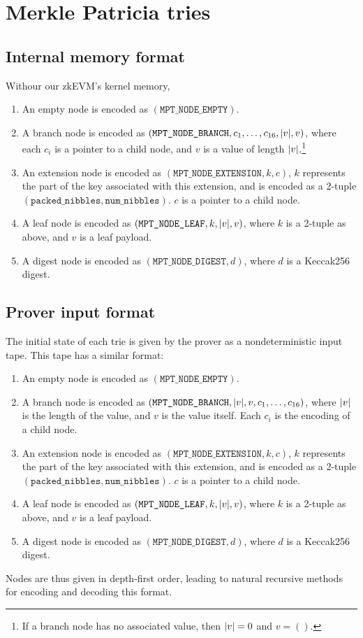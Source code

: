 \section{Merkle Patricia tries}
\label{tries}

\subsection{Internal memory format}

Withour our zkEVM's kernel memory,
\begin{enumerate}
  \item An empty node is encoded as $(\texttt{MPT\_NODE\_EMPTY})$.
  \item A branch node is encoded as $(\texttt{MPT\_NODE\_BRANCH}, c_1, \dots, c_{16}, \lvert v\rvert, v)$, where each $c_i$ is a pointer to a child node, and $v$ is a value of length $\lvert v\rvert$.\footnote{If a branch node has no associated value, then $\lvert v\rvert = 0$ and $v = ()$.}
  \item An extension node is encoded as $(\texttt{MPT\_NODE\_EXTENSION}, k, c)$, $k$ represents the part of the key associated with this extension, and is encoded as a 2-tuple $(\texttt{packed\_nibbles}, \texttt{num\_nibbles})$. $c$ is a pointer to a child node.
  \item A leaf node is encoded as $(\texttt{MPT\_NODE\_LEAF}, k, \lvert v\rvert, v)$, where $k$ is a 2-tuple as above, and $v$ is a leaf payload.
  \item A digest node is encoded as $(\texttt{MPT\_NODE\_DIGEST}, d)$, where $d$ is a Keccak256 digest.
\end{enumerate}


\subsection{Prover input format}

The initial state of each trie is given by the prover as a nondeterministic input tape. This tape has a similar format:
\begin{enumerate}
  \item An empty node is encoded as $(\texttt{MPT\_NODE\_EMPTY})$.
  \item A branch node is encoded as $(\texttt{MPT\_NODE\_BRANCH}, \lvert v\rvert, v, c_1, \dots, c_{16})$, where $\lvert v\rvert$ is the length of the value, and $v$ is the value itself. Each $c_i$ is the encoding of a child node.
  \item An extension node is encoded as $(\texttt{MPT\_NODE\_EXTENSION}, k, c)$, $k$ represents the part of the key associated with this extension, and is encoded as a 2-tuple $(\texttt{packed\_nibbles}, \texttt{num\_nibbles})$. $c$ is a pointer to a child node.
  \item A leaf node is encoded as $(\texttt{MPT\_NODE\_LEAF}, k, \lvert v\rvert, v)$, where $k$ is a 2-tuple as above, and $v$ is a leaf payload.
  \item A digest node is encoded as $(\texttt{MPT\_NODE\_DIGEST}, d)$, where $d$ is a Keccak256 digest.
\end{enumerate}
Nodes are thus given in depth-first order, leading to natural recursive methods for encoding and decoding this format.
